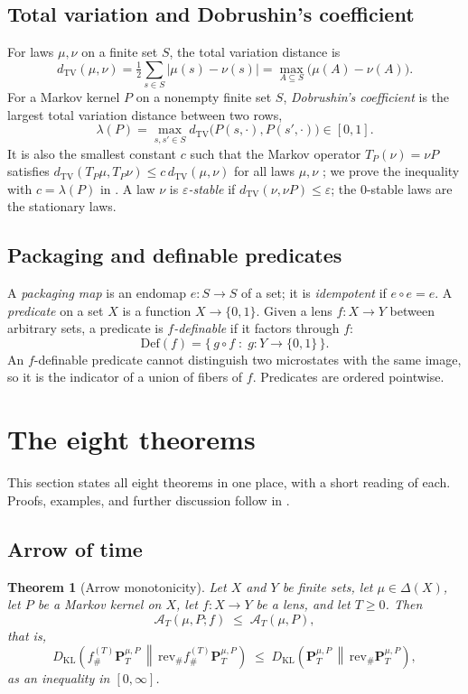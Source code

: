 \documentclass[11pt]{article}
\newtheorem{theorem}{Theorem}[section]
\theoremstyle{definition}
\newcommand{\Def}{\mathrm{Def}}
\newcommand{\rev}{\mathrm{rev}}
\newcommand{\1}{\mathbf{1}}
\newcommand{\DKL}[2]{D_{\mathrm{KL}}\!\left(#1\,\middle\|\,#2\right)}
\newcommand{\dTV}{d_{\mathrm{TV}}}
\newcommand{\Arr}{\mathcal{A}}
\newcommand{\ThmStmtNGARROWDPI}{Let $X$ and $Y$ be finite sets, let $\mu\in\Delta(X)$, let $P$ be a Markov kernel on $X$, let $f:X\to Y$ be a lens, and let $T\ge 0$. Then
\[
  \Arr_T(\mu,P;f)\;\le\;\Arr_T(\mu,P),
\]
that is,
\[
  \DKL{f^{(T)}_{\#}\mathbf{P}^{\mu,P}_T}{\rev_{\#}f^{(T)}_{\#}\mathbf{P}^{\mu,P}_T}\;\le\;\DKL{\mathbf{P}^{\mu,P}_T}{\rev_{\#}\mathbf{P}^{\mu,P}_T},
\]
as an inequality in $[0,\infty]$.
}
\begin{document}
\subsection{Total variation and Dobrushin's coefficient}
For laws $\mu,\nu$ on a finite set $S$, the total variation distance is
\[
  \dTV(\mu,\nu)=\tfrac12\sum_{s\in S}|\mu(s)-\nu(s)|=\max_{A\subseteq S}\bigl(\mu(A)-\nu(A)\bigr).
\]
For a Markov kernel $P$ on a nonempty finite set $S$, \emph{Dobrushin's coefficient} is the largest total variation distance between two rows,
\[
  \lambda(P)=\max_{s,s'\in S}\dTV\bigl(P(s,\cdot),P(s',\cdot)\bigr)\in[0,1].
\]
It is also the smallest constant $c$ such that the Markov operator $T_P(\nu)=\nu P$ satisfies $\dTV(T_P\mu,T_P\nu)\le c\,\dTV(\mu,\nu)$ for all laws $\mu,\nu$ \citep{Dobrushin1956,Seneta2006}; we prove the inequality with $c=\lambda(P)$ in .
A law $\nu$ is \emph{$\varepsilon$-stable} if $\dTV(\nu,\nu P)\le\varepsilon$; the $0$-stable laws are the stationary laws.

\subsection{Packaging and definable predicates}
A \emph{packaging map} is an endomap $e:S\to S$ of a set; it is \emph{idempotent} if $e\circ e=e$.
A \emph{predicate} on a set $X$ is a function $X\to\{0,1\}$.
Given a lens $f:X\to Y$ between arbitrary sets, a predicate is \emph{$f$-definable} if it factors through $f$:
\[
  \Def(f)=\bigl\{\,g\circ f\;:\;g:Y\to\{0,1\}\,\bigr\}.
\]
An $f$-definable predicate cannot distinguish two microstates with the same image, so it is the indicator of a union of fibers of $f$.
Predicates are ordered pointwise.
 \section{The eight theorems}\label{sec:main-results}

This section states all eight theorems in one place, with a short reading of each.
Proofs, examples, and further discussion follow in .

\subsection*{Arrow of time}

\begin{theorem}[Arrow monotonicity]\label{thm:NG_ARROW_DPI}
\ThmStmtNGARROWDPI
\end{theorem}
\end{document}
